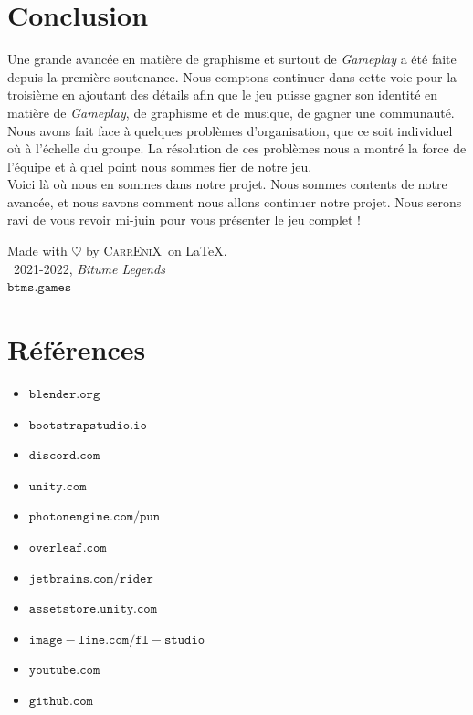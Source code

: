 \documentclass[12pt,a4paper]{article}
\newcommand{\btmlgs}{\textsl{Bitume Legends}}
\newcommand{\CEX}{\textsc{CarrEniX}}
\newcommand{\SITE}{\(\mathtt{btms.games}\)}
\begin{document}
    \section*{Conclusion}
        Une grande avancée en matière de graphisme et surtout de \textit{Gameplay} a été faite depuis la
        première soutenance. Nous comptons continuer dans cette voie pour la troisième en ajoutant des 
        détails afin que le jeu puisse gagner son identité en matière de \textit{Gameplay}, de 
        graphisme et de musique, de gagner une communauté.
        Nous avons fait face à quelques problèmes d'organisation, que ce soit individuel où à l'échelle du groupe. La résolution de ces problèmes nous a montré la force de l'équipe et à quel point nous sommes fier de notre jeu.\\
        Voici là où nous en sommes dans notre projet.
        Nous sommes contents de notre avancée, et nous savons comment
        nous allons continuer notre projet. 
        Nous serons ravi de vous revoir mi-juin pour vous présenter le jeu complet !\\



    \begin{center}
        Made with $\heartsuit$ by \CEX\, on \LaTeX.\\
        \textcopyright\, 2021-2022, \btmlgs\\
        \SITE
    \end{center}


    \clearpage
    \section*{Références}
        \begin{itemize}
            \item \(\mathtt{blender.org}\)
            \item \(\mathtt{bootstrapstudio.io}\)
            \item \(\mathtt{discord.com}\)
            \item \(\mathtt{unity.com}\)
            \item \(\mathtt{photonengine.com/pun}\)
            \item \(\mathtt{overleaf.com}\)
            \item \(\mathtt{jetbrains.com/rider}\)
            \item \(\mathtt{assetstore.unity.com}\)
            \item \(\mathtt{image-line.com/fl-studio}\)
            \item \(\mathtt{youtube.com}\)
            \item \(\mathtt{github.com}\)
        \end{itemize}
\end{document}
